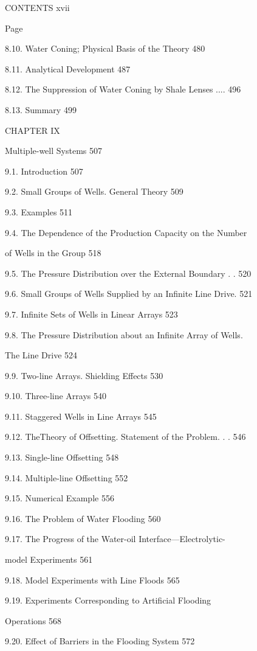 \documentclass[
  11pt,
]{article}
\begin{document}
CONTENTS xvii \par
Page \par
8.10. Water Coning; Physical Basis of the Theory 480 \par
8.11. Analytical Development 487 \par
8.12. The Suppression of Water Coning by Shale Lenses .... 496 \par
8.13. Summary 499 \par
CHAPTER IX \par
Multiple-well Systems 507 \par
9.1. Introduction 507 \par
9.2. Small Groups of Wells. General Theory 509 \par
9.3. Examples 511 \par
9.4. The Dependence of the Production Capacity on the Number \par
of Wells in the Group 518 \par
9.5. The Pressure Distribution over the External Boundary . . 520 \par
9.6. Small Groups of Wells Supplied by an Infinite Line Drive. 521 \par
9.7. Infinite Sets of Wells in Linear Arrays 523 \par
9.8. The Pressure Distribution about an Infinite Array of Wells. \par
The Line Drive 524 \par
9.9. Two-line Arrays. Shielding Effects 530 \par
9.10. Three-line Arrays 540 \par
9.11. Staggered Wells in Line Arrays 545 \par
9.12. The\textquotesingle Theory of Offsetting. Statement of the Problem. . . 546 \par
9.13. Single-line Offsetting 548 \par
9.14. Multiple-line Offsetting 552 \par
9.15. Numerical Example 556 \par
9.16. The Problem of Water Flooding 560 \par
9.17. The Progress of the Water-oil Interface---Electrolytic- \par
model Experiments 561 \par
9.18. Model Experiments with Line Floods 565 \par
9.19. Experiments Corresponding to Artificial Flooding  \par
Operations 568 \par
9.20. Effect of Barriers in the Flooding System 572 \par
\end{document}

